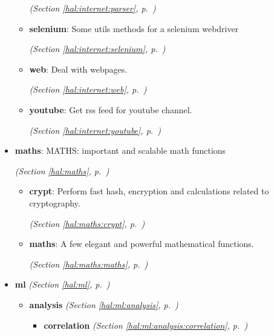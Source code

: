 \begin{itemize}
\begin{itemize}
  \textit{(Section \ref{hal:internet:parser}, p.~\pageref{hal:internet:parser})}

    \item \textbf{selenium}: Some utils methods for a selenium webdriver 


  \textit{(Section \ref{hal:internet:selenium}, p.~\pageref{hal:internet:selenium})}

    \item \textbf{web}: Deal with webpages. 


  \textit{(Section \ref{hal:internet:web}, p.~\pageref{hal:internet:web})}

    \item \textbf{youtube}: Get rss feed for youtube channel. 


  \textit{(Section \ref{hal:internet:youtube}, p.~\pageref{hal:internet:youtube})}

  \end{itemize}
\item \textbf{maths}: MATHS: important and scalable math functions 


  \textit{(Section \ref{hal:maths}, p.~\pageref{hal:maths})}

  \begin{itemize}
\setlength{\parskip}{0ex}
    \item \textbf{crypt}: Perform fast hash, encryption and calculations related to cryptography. 


  \textit{(Section \ref{hal:maths:crypt}, p.~\pageref{hal:maths:crypt})}

    \item \textbf{maths}: A few elegant and powerful mathematical functions. 


  \textit{(Section \ref{hal:maths:maths}, p.~\pageref{hal:maths:maths})}

  \end{itemize}
\item \textbf{ml}
  \textit{(Section \ref{hal:ml}, p.~\pageref{hal:ml})}

  \begin{itemize}
\setlength{\parskip}{0ex}
    \item \textbf{analysis}
  \textit{(Section \ref{hal:ml:analysis}, p.~\pageref{hal:ml:analysis})}

      \begin{itemize}
    \setlength{\parskip}{0ex}
        \item \textbf{correlation}
  \textit{(Section \ref{hal:ml:analysis:correlation}, p.~\pageref{hal:ml:analysis:correlation})}


\end{itemize}
\end{itemize}
\end{itemize}
